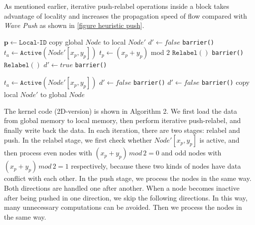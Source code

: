 As mentioned earlier, iterative push-relabel operations inside a block takes advantage of locality and increases the propagation speed of flow compared with \textit{Wave Push} as shown in \figurename \ref{figure heuristic push}.

\begin{algorithm}
\label{algorithm block-wise p-r}
\caption{$\texttt{Push-Relabel}(Node)$}
\begin{algorithmic}
\STATE $\mathbf{p} \leftarrow \texttt{Local-ID}$
\STATE copy global $Node$ to local $Node'$
\STATE $d' \leftarrow false$
\STATE \texttt{barrier()}
    \STATE $t_a \leftarrow \texttt{Active}(Node'[x_p, y_p])$
    \STATE $t_p \leftarrow (x_p + y_p)$ mod $2$
       \STATE $ \texttt{Relabel}()$
    \ENDIF
    \STATE \texttt{barrier()}
       \STATE $ \texttt{Relabel}()$
    \ENDIF
    \STATE $d' \leftarrow true$
    \STATE \texttt{barrier()}

    \STATE $t_a \leftarrow \texttt{Active}(Node'[x_p, y_p])$
        \STATE $d' \leftarrow false$
    \ENDIF
    \STATE \texttt{barrier()}
        \STATE $d' \leftarrow false$
    \ENDIF
    \STATE \texttt{barrier()}
\ENDWHILE
\STATE copy local $Node'$ to global $Node$
\end{algorithmic}
\end{algorithm}

The kernel code (2D-version) is shown in Algorithm 2.
We first load the data from global memory to local memory, then perform iterative push-relabel, and finally write back the data.
In each iteration, there are two stages: relabel and push.
In the relabel stage, we first check whether $Node'[x_p, y_p]$ is active, and then process even nodes with $(x_p + y_p) \, mod \, 2 = 0$ and odd nodes with $(x_p + y_p) \, mod \, 2 = 1$ respectively, because these two kinds of nodes have data conflict with each other.
In the push stage, we process the nodes in the same way.
Both directions are handled one after another.
When a node becomes inactive after being pushed in one direction, we skip the following directions.
In this way, many unnecessary computations can be avoided.
Then we process the nodes in the same way.

